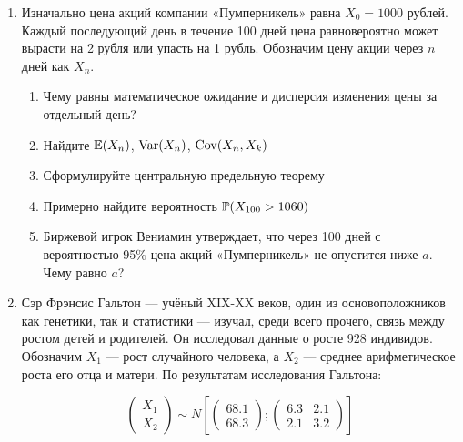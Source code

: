 \documentclass[12pt, a4paper]{article}\usepackage[]{graphicx}\usepackage[]{color}
\begin{document}
\begin{enumerate}
					\item Изначально цена акций компании «Пумперникель» равна $X_0=1000$ рублей. Каждый последующий день в течение 100 дней цена равновероятно может вырасти на 2 рубля или упасть на 1 рубль. Обозначим цену акции через $n$ дней как $X_n$.
					\begin{enumerate}
						\item Чему равны математическое ожидание и дисперсия изменения цены за отдельный день?
						\item Найдите $\E(X_n)$, $\Var(X_n)$, $\Cov(X_n, X_k)$
						\item Сформулируйте центральную предельную теорему
						\item Примерно найдите вероятность $\P(X_{100}>1060)$
						\item Биржевой игрок Вениамин утверждает, что через 100 дней с вероятностью 95\% цена акций «Пумперникель» не опустится ниже $a$. Чему равно $a$?
					\end{enumerate}
					\item  Сэр Фрэнсис Гальтон —  учёный XIX-XX веков, один из основоположников как
					генетики, так и статистики — изучал, среди всего прочего, связь между ростом детей и родителей.  Он исследовал данные о росте 928 индивидов. Обозначим $X_1$ — рост случайного человека, а $X_2$ — среднее арифметическое роста его отца и матери. По результатам исследования Гальтона:


					\[
					\begin{pmatrix}
					X_1 \\
					X_2
					\end{pmatrix}
					\sim
					N\left[
					\begin{pmatrix}
					68.1 \\
					68.3
					\end{pmatrix};
					\begin{pmatrix}
					6.3 & 2.1 \\
					2.1 & 3.2
					\end{pmatrix}
					\right]
					\]


\end{enumerate}
\end{document}
